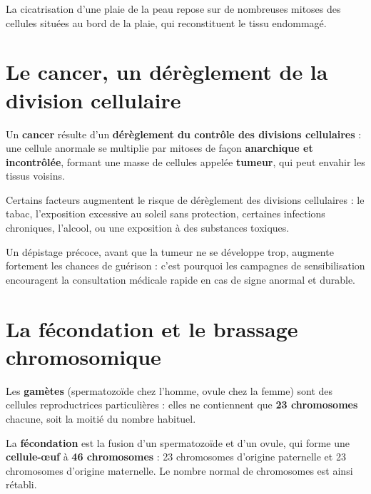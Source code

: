 \begin{exemple}
La cicatrisation d'une plaie de la peau repose sur de nombreuses mitoses des cellules
situées au bord de la plaie, qui reconstituent le tissu endommagé.
\end{exemple}

\section{Le cancer, un dérèglement de la division cellulaire}

\begin{definition}[Cancer]
Un \textbf{cancer} résulte d'un \textbf{dérèglement du contrôle des divisions
cellulaires} : une cellule anormale se multiplie par mitoses de façon
\textbf{anarchique et incontrôlée}, formant une masse de cellules appelée
\textbf{tumeur}, qui peut envahir les tissus voisins.
\end{definition}

\begin{propriete}
Certains facteurs augmentent le risque de dérèglement des divisions cellulaires : le
tabac, l'exposition excessive au soleil sans protection, certaines infections
chroniques, l'alcool, ou une exposition à des substances toxiques.
\end{propriete}

\begin{remarque}
Un dépistage précoce, avant que la tumeur ne se développe trop, augmente fortement les
chances de guérison : c'est pourquoi les campagnes de sensibilisation encouragent la
consultation médicale rapide en cas de signe anormal et durable.
\end{remarque}

\section{La fécondation et le brassage chromosomique}

\begin{definition}[Gamètes]
Les \textbf{gamètes} (spermatozoïde chez l'homme, ovule chez la femme) sont des
cellules reproductrices particulières : elles ne contiennent que \textbf{23
chromosomes} chacune, soit la moitié du nombre habituel.
\end{definition}

\begin{definition}[Fécondation]
La \textbf{fécondation} est la fusion d'un spermatozoïde et d'un ovule, qui forme une
\textbf{cellule-œuf} à \textbf{46 chromosomes} : 23 chromosomes d'origine paternelle et
23 chromosomes d'origine maternelle. Le nombre normal de chromosomes est ainsi
rétabli.
\end{definition}

